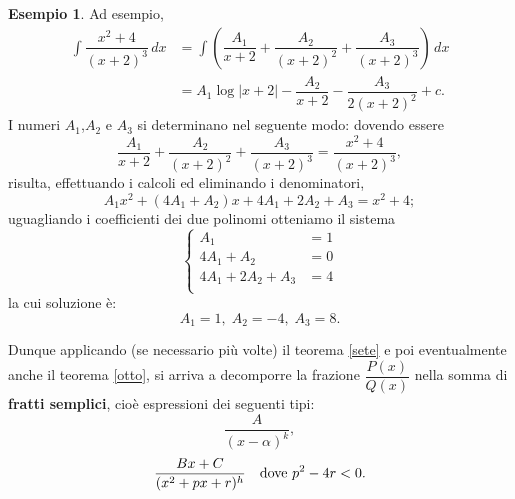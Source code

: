 \documentclass{article}
\theoremstyle{plain}
\theoremstyle{definition}
\newtheorem{exmp}{Esempio}[section]
\theoremstyle{remark}
\begin{document}
\vspace{10pt}

\begin{exmp}
    Ad esempio,
    \begin{align*}
        \int\dfrac{x^2+4}{(x+2)^3}\,dx&=\int\left(\dfrac{A_1}{x+2}+\dfrac{A_2}{(x+2)^2}+\dfrac{A_3}{(x+2)^3}\right)\,dx\\
        &=A_1\log|x+2|-\dfrac{A_2}{x+2}-\dfrac{A_3}{2(x+2)^2}+c.
    \end{align*}
    I numeri $A_1$,$A_2$ e $A_3$ si determinano nel seguente modo: dovendo essere \[\dfrac{A_1}{x+2}+\dfrac{A_2}{(x+2)^2}+\dfrac{A_3}{(x+2)^3}=\dfrac{x^2+4}{(x+2)^3},\] risulta, effettuando i calcoli ed eliminando i denominatori, 
    \[A_1x^2+(4A_1+A_2)x+4A_1+2A_2+A_3=x^2+4;\]
    uguagliando i coefficienti dei due polinomi otteniamo il sistema 
    \[\begin{cases}
        A_1&=1\\
        4A_1+A_2&=0\\
        4A_1+2A_2+A_3&=4\\
    \end{cases}\]
    la cui soluzione è: \[A_1=1,\; A_2=-4,\; A_3=8.\]
\end{exmp}

\vspace{10pt}

Dunque applicando (se necessario più volte) il teorema \ref{sete} e poi eventualmente anche il teorema \ref{otto}, si arriva a decomporre 
la frazione $\dfrac{P(x)}{Q(x)}$ nella somma di \textbf{fratti semplici}, cioè espressioni dei seguenti tipi:
\begin{equation}
    \dfrac{A}{(x-\alpha)^k},\label{diesci}
\end{equation}
\begin{equation}
    \dfrac{Bx+C}{(x^2+px+r)^h}\quad\textup{dove }p^2-4r<0.\label{undisci}
\end{equation}
\end{document}
